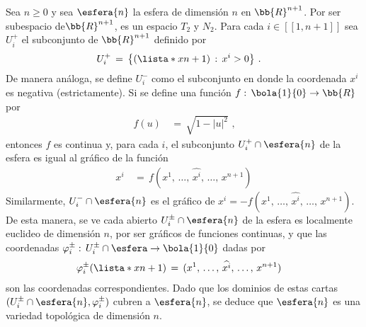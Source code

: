 \begin{ejemplo}%
Sea $n\geq 0$ y sea $\esfera{n}$ la esfera de dimensi\'{o}n $n$ en
$\bb{R}^{n+1}$. Por ser subespacio de$\bb{R}^{n+1}$, es un espacio
$T_{2}$ y $N_{2}$. Para cada $i\in[\![1,n+1]\!]$ sea $U_{i}^{+}$ el
subconjunto de $\bb{R}^{n+1}$ definido por
\begin{align*}
	U_{i}^{+} & \,=\,\big\lbrace (\lista*{x}{n+1})\,:\,x^{i}>0
				\big\rbrace
	\text{ .}
\end{align*}
%
De manera an\'{a}loga, se define $U_{i}^{-}$ como el subconjunto en donde
la coordenada $x^{i}$ es negativa (estrictamente). Si se define una
funci\'{o}n $f:\,\bola{1}{0}\rightarrow\bb{R}$ por
\begin{align*}
	f(u) & \,=\,\sqrt{1-|u|^{2}}\text{ ,}
\end{align*}
%
entonces $f$ es continua y, para cada $i$, el subconjunto
$U_{i}^{+}\cap\esfera{n}$ de la esfera es igual al gr\'{a}fico de la
funci\'{o}n
\begin{align*}
	x^{i} & \,=\,f(x^{1},\,\dots,\,\widehat{x^{i}},\,\dots,\,x^{n+1})
\end{align*}
%
Similarmente, $U_{i}^{-}\cap\esfera{n}$ es el gr\'{a}fico de
$x^{i}=-f(x^{1},\,\dots,\,\widehat{x^{i}},\,\dots,\,x^{n+1})$. De esta
manera, se ve cada abierto $U_{i}^{\pm}\cap\esfera{n}$ de la esfera es
localmente euclideo de dimensi\'{o}n $n$, por ser gr\'{a}ficos de funciones
continuas, y que las coordenadas
$\varphi_{i}^{\pm}:\,U_{i}^{\pm}\cap\esfera\rightarrow\bola{1}{0}$ dadas por
\begin{align*}
	\varphi_{i}^{\pm}(\lista*{x}{n+1}) & \,=\,
		(x^{1},\,\dots,\,\widehat{x^{i}},\,\dots,\,x^{n+1})
\end{align*}
%
son las coordenadas correspondientes. Dado que los dominios de estas cartas
$(U_{i}^{\pm}\cap\esfera{n},\varphi_{i}^{\pm})$ cubren a $\esfera{n}$, se
deduce que $\esfera{n}$ es una variedad topol\'{o}gica de dimensi\'{o}n
$n$.


\end{ejemplo}
